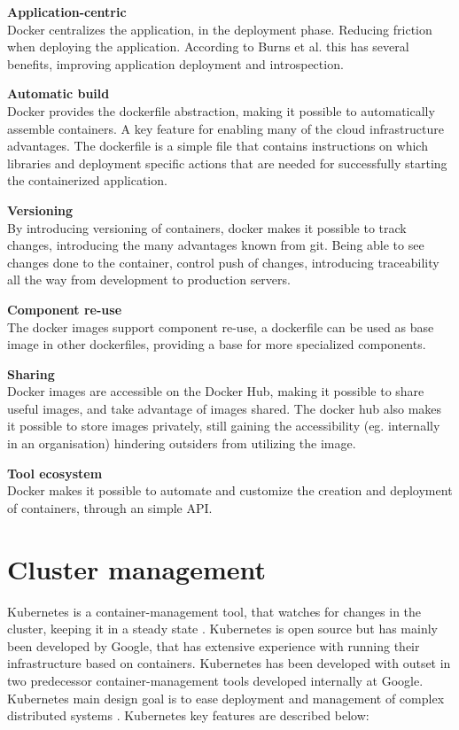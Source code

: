 \textbf{Application-centric}\\
Docker centralizes the application, in the deployment phase. Reducing friction when deploying the application. According to Burns et al. \cite{burns2016borg} this has several benefits, improving application deployment and introspection.

\textbf{Automatic build}\\
Docker provides the dockerfile abstraction, making it possible to automatically assemble containers. A key feature for enabling many of the cloud infrastructure advantages. The dockerfile is a simple file that contains instructions on which libraries and deployment specific actions that are needed for successfully starting the containerized application.

\textbf{Versioning}\\
By introducing versioning of containers, docker makes it possible to track changes, introducing the many advantages known from git. Being able to see changes done to the container, control push of changes, introducing traceability all the way from development to production servers.

\textbf{Component re-use}\\
The docker images support component re-use, a dockerfile can be used as base image in other dockerfiles, providing a base for more specialized components.

\textbf{Sharing}\\
Docker images are accessible on the Docker Hub, making it possible to share useful images, and take advantage of images shared. The docker hub also makes it possible to store images privately, still gaining the accessibility (eg. internally in an organisation) hindering outsiders from utilizing the image.

\textbf{Tool ecosystem}\\
Docker makes it possible to automate and customize the creation and deployment of containers, through an simple API.

\section{Cluster management}
\label{sec:cluster}
Kubernetes is a container-management tool, that watches for changes in the cluster, keeping it in a steady state \cite{burns2016borg}. Kubernetes is open source but has mainly been developed by Google, that has extensive experience with running their infrastructure based on containers. Kubernetes has been developed with outset in two predecessor container-management tools developed internally at Google. Kubernetes main design goal is to ease deployment and management of complex distributed systems \cite{kubernetes_frontpage}. Kubernetes key features are described below:

